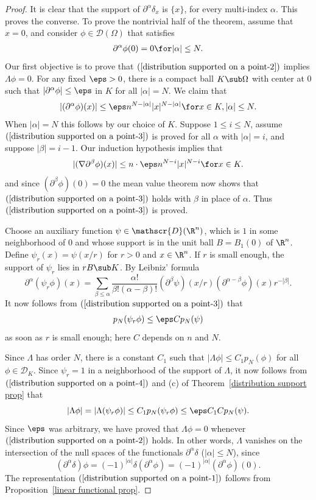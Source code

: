 \begin{proof}
It is clear that the support of $\partial^\alpha\delta_x$ is $\{x\}$, for every multi-index $\alpha$. This proves the converse. To prove the nontrivial half of the theorem, assume that $x=0$, and consider $\phi\in\mathscr{D}(\Omega)$ that satisfies
\begin{align}\label{distribution supported on a point-2}
\partial^\alpha\phi(0)=0\for|\alpha|\leq N.
\end{align}
Our first objective is to prove that $(\ref{distribution supported on a point-2})$ implies $\Lambda\phi=0$. For any fixed $\eps>0$, there is a compact ball $K\sub\Omega$ with center at $0$ such that $|\partial^\alpha\phi|\leq\eps$ in $K$ for all $|\alpha|=N$. We claim that
\begin{align}\label{distribution supported on a point-3}
|(\partial^\alpha\phi)(x)|\leq\eps n^{N-|\alpha|}|x|^{N-|\alpha|}\for x\in K,|\alpha|\leq N.
\end{align}
When $|\alpha|=N$ this follows by our choice of $K$. Suppose $1\leq i\leq N$, assume $(\ref{distribution supported on a point-3})$ is proved for all $\alpha$ with $|\alpha|=i$, and suppose $|\beta|=i-1$. Our induction hypothesis implies that
\[|(\nabla\partial^\beta\phi)(x)|\leq n\cdot\eps n^{N-i}|x|^{N-i}\for x\in K.\]
and since $(\partial^\beta\phi)(0)=0$ the mean value theorem now shows that $(\ref{distribution supported on a point-3})$ holds with $\beta$ in place of $\alpha$. Thus $(\ref{distribution supported on a point-3})$ is proved.\par
Choose an auxiliary function $\psi\in\mathscr{D}(\R^n)$, which is $1$ in some neighborhood of $0$ and whose support is in the unit ball $B=B_1(0)$ of $\R^n$. Define $\psi_r(x)=\psi(x/r)$ for $r>0$ and $x\in\R^n$. If $r$ is small enough, the support of $\psi_r$ lies in $rB\sub K$. By Leibniz' formula
\[\partial^\alpha(\psi_r\phi)(x)=\sum_{\beta\leq\alpha}\frac{\alpha!}{\beta!(\alpha-\beta)!}(\partial^{\beta}\psi)(x/r)(\partial^{\alpha-\beta}\phi)(x)r^{-|\beta|}.\]
It now follows from $(\ref{distribution supported on a point-3})$ that
\begin{align}\label{distribution supported on a point-4}
p_N(\psi_r\phi)\leq\eps Cp_N(\psi)
\end{align}
as soon as $r$ is small enough; here $C$ depends on $n$ and $N$.\par
Since $\Lambda$ has order $N$, there is a constant $C_1$ such that $|\Lambda\phi|\leq C_1p_N(\phi)$ for all $\phi\in\mathscr{D}_K$. Since $\psi_r=1$ in a neighborhood of the support of $\Lambda$, it now follows from $(\ref{distribution supported on a point-4})$ and (c) of Theorem~\ref{distribution support prop} that
\[|\Lambda\phi|=|\Lambda(\psi_r\phi)|\leq C_1p_N(\psi_r\phi)\leq\eps C_1Cp_N(\psi).\]
Since $\eps$ was arbitrary, we have proved that $\Lambda\phi=0$ whenever $(\ref{distribution supported on a point-2})$ holds. In other words, $\Lambda$ vanishes on the intersection of the null spaces of the functionals $\partial^\alpha\delta$ ($|\alpha|\leq N$), since
\[(\partial^\alpha\delta)\phi=(-1)^{|\alpha|}\delta(\partial^\alpha\phi)=(-1)^{|\alpha|}(\partial^\alpha\phi)(0).\]
The representation $(\ref{distribution supported on a point-1})$ follows from Proposition~\ref{linear functional prop}.
\end{proof}
